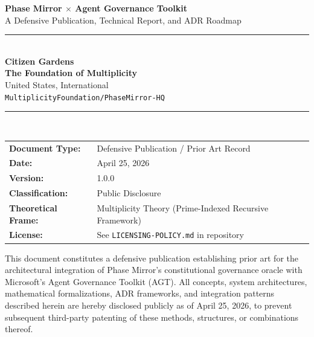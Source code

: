 \documentclass[12pt,a4paper]{article}
\theoremstyle{definition}
\theoremstyle{remark}
\begin{document}

\begin{titlepage}
\centering
\vspace*{2cm}
{\Huge\bfseries\color{pmprimary} Phase Mirror $\times$ Agent Governance Toolkit}\\[0.5cm]
{\Large\color{pmaccent} A Defensive Publication, Technical Report, and ADR Roadmap}\\[1.5cm]
\rule{\textwidth}{1pt}\\[0.5cm]
{\large\bfseries Citizen Gardens \\ The Foundation of Multiplicity}\\[0.3cm]
{\normalsize United States, International}\\[0.3cm]
{\normalsize \texttt{MultiplicityFoundation/PhaseMirror-HQ}}\\[0.5cm]
\rule{\textwidth}{1pt}\\[1cm]

\begin{tabular}{ll}
  \textbf{Document Type:}   & Defensive Publication / Prior Art Record \\[4pt]
  \textbf{Date:}            & April 25, 2026 \\[4pt]
  \textbf{Version:}         & 1.0.0 \\[4pt]
  \textbf{Classification:}  & Public Disclosure \\[4pt]
  \textbf{Theoretical Frame:} & Multiplicity Theory (Prime-Indexed Recursive Framework)\\[4pt]
  \textbf{License:}         & See \texttt{LICENSING-POLICY.md} in repository \\
\end{tabular}

\vfill

\begin{defensebox}
This document constitutes a defensive publication establishing prior art for the
architectural integration of Phase Mirror's constitutional governance oracle with
Microsoft's Agent Governance Toolkit (AGT). All concepts, system architectures,
mathematical formalizations, ADR frameworks, and integration patterns described
herein are hereby disclosed publicly as of April 25, 2026, to prevent subsequent
third-party patenting of these methods, structures, or combinations thereof.
\end{defensebox}

\end{titlepage}
\end{document}
